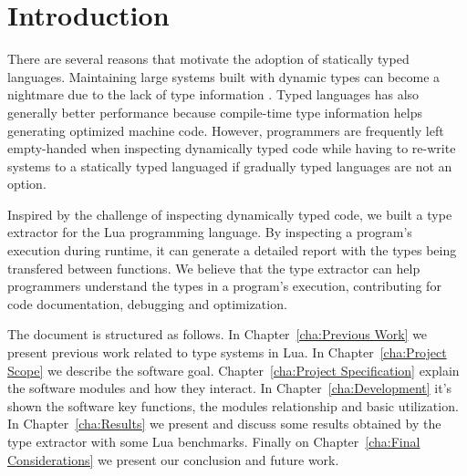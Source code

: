 
\chapter{Introduction}
There are several reasons that motivate the adoption of statically typed languages. Maintaining large systems built with dynamic types can become a nightmare due to the lack of type information \cite{takikawa_is_2016}. Typed languages has also generally better performance because compile-time type information helps generating optimized machine code. However, programmers are frequently left empty-handed when inspecting dynamically typed code while having to re-write systems to a statically typed languaged if gradually typed languages are not an option.
\par
Inspired by the challenge of inspecting dynamically typed code, we built a type extractor for the Lua programming language. By inspecting a program's execution during runtime, it can generate a detailed report with the types being transfered between functions. We believe that the type extractor can help programmers understand the types in a program's execution, contributing for code documentation, debugging and optimization.
\par
The document is structured as follows. In Chapter~\ref{cha:Previous Work} we present previous work related to type systems in Lua. In Chapter~\ref{cha:Project Scope} we describe the software goal. Chapter~\ref{cha:Project Specification} explain the software modules and how they interact. In Chapter~\ref{cha:Development} it's shown the software key functions, the modules relationship and basic utilization. In Chapter~\ref{cha:Results} we present and discuss some results obtained by the type extractor with some Lua benchmarks. Finally on Chapter~\ref{cha:Final Considerations} we present our conclusion and future work.




